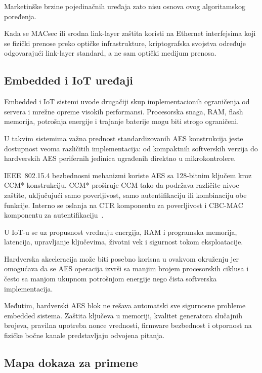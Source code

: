 Marketinške brzine pojedinačnih uređaja zato nisu osnova ovog
algoritamskog poređenja.

Kada se MACsec ili srodna link-layer zaštita koristi na Ethernet
interfejsima koji se fizički prenose preko optičke infrastrukture,
kriptografska svojstva određuje odgovarajući link-layer standard, a
ne sam optički medijum prenosa.


\subsection{Embedded i IoT uređaji}
\label{subsec:iot}

Embedded i IoT sistemi uvode drugačiji skup implementacionih
ograničenja od servera i mrežne opreme visokih performansi. Procesorska
snaga, RAM, flash memorija, potrošnja energije i trajanje baterije mogu
biti strogo ograničeni.

U takvim sistemima važna prednost standardizovanih AES konstrukcija
jeste dostupnost veoma različitih implementacija: od kompaktnih
softverskih verzija do hardverskih AES perifernih jedinica ugrađenih
direktno u mikrokontrolere.

IEEE~802.15.4 bezbednosni mehanizmi koriste AES sa 128-bitnim
ključem kroz CCM* konstrukciju. CCM* proširuje CCM tako da podržava
različite nivoe zaštite, uključujući samo poverljivost, samo
autentifikaciju ili kombinaciju obe funkcije. Interno se oslanja na
CTR komponentu za poverljivost i CBC-MAC komponentu za
autentifikaciju~\cite{ieee802154}.

U IoT-u se uz propusnost vrednuju energija, RAM i programska memorija,
latencija, upravljanje ključevima, životni vek i sigurnost tokom
eksploatacije.

Hardverska akceleracija može biti posebno korisna u ovakvom okruženju
jer omogućava da se AES operacija izvrši sa manjim brojem procesorskih
ciklusa i često sa manjom ukupnom potrošnjom energije nego čista
softverska implementacija.

Međutim, hardverski AES blok ne rešava automatski sve sigurnosne
probleme embedded sistema. Zaštita ključeva u memoriji, kvalitet
generatora slučajnih brojeva, pravilna upotreba nonce vrednosti,
firmware bezbednost i otpornost na fizičke bočne kanale predstavljaju
odvojena pitanja.


\subsection{Mapa dokaza za primene}
\label{subsec:telekom_mapa}

